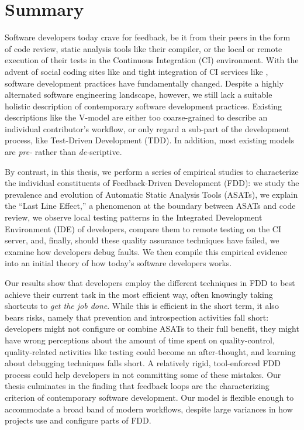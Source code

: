 \chapter*{Summary}

Software developers today crave for feedback, be it from their peers in the form of code review,
static analysis tools like their compiler, or the local or remote execution of their tests in the
Continuous Integration (CI) environment. With the advent of social coding sites like \github and
tight integration of CI services like \travis, software development practices have fundamentally
changed.  Despite a highly alternated software engineering landscape, however, we still lack a
suitable holistic description of contemporary software development practices. Existing descriptions
like the V-model are either too coarse-grained to describe an individual contributor's workflow, or
only regard a sub-part of the development process, like Test-Driven Development (TDD). In addition,
most existing models are \emph{pre-} rather than \emph{de-}scriptive.

By contrast, in this thesis, we perform a series of empirical studies to characterize the
individual constituents of Feedback-Driven Development (FDD): we study the prevalence and evolution
of Automatic Static Analysis Tools (ASATs), we explain the ``Last Line Effect,'' a phenomenon at
the boundary between ASATs and code review, we observe local testing patterns in the Integrated
Development Environment (IDE) of developers, compare them to remote testing on the CI server, and,
finally, should these quality assurance techniques have failed, we examine how developers debug
faults. We then compile this empirical evidence into an initial theory of how today's software
developers works.

Our results show that developers employ the different techniques in FDD to best achieve their
current task in the most efficient way, often knowingly taking shortcuts to \emph{get the job
  done}. While this is efficient in the short term, it also bears risks, namely that prevention and
introspection activities fall short: developers might not configure or combine ASATs to their full
benefit, they might have wrong perceptions about the amount of time spent on quality-control,
quality-related activities like testing could become an after-thought, and learning about debugging
techniques falls short. A relatively rigid, tool-enforced FDD process could help developers in not
committing some of these mistakes. Our thesis culminates in the finding that feedback loops are
the characterizing criterion of contemporary software development. Our model is flexible enough to
accommodate a broad band of modern workflows, despite large variances in how projects use and
configure parts of FDD.


